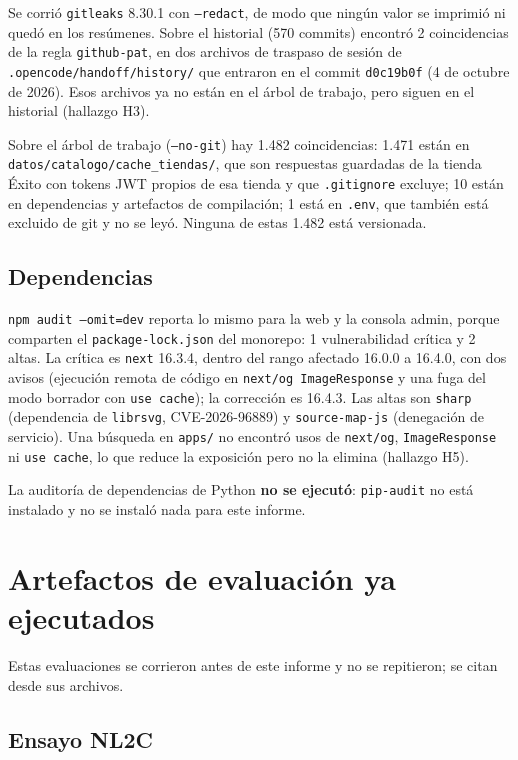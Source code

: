 \documentclass[11pt,letterpaper]{article}
\newcommand{\ruta}[1]{\texttt{\small #1}}
\begin{document}
Se corrió \ruta{gitleaks} 8.30.1 con \ruta{--redact}, de modo que ningún valor se imprimió ni quedó en los
resúmenes. Sobre el historial (570 commits) encontró 2 coincidencias de la regla \ruta{github-pat}, en dos
archivos de traspaso de sesión de \ruta{.opencode/\allowbreak{}handoff/\allowbreak{}history/} que entraron en el commit \ruta{d0c19b0f}
(4 de octubre de 2026). Esos archivos ya no están en el árbol de trabajo, pero siguen en el historial
(hallazgo H3).

Sobre el árbol de trabajo (\ruta{--no-git}) hay 1.482 coincidencias: 1.471 están en
\ruta{datos/\allowbreak{}catalogo/\allowbreak{}cache\_\allowbreak{}tiendas/}, que son respuestas guardadas de la tienda Éxito con tokens JWT
propios de esa tienda y que \ruta{.gitignore} excluye; 10 están en dependencias y artefactos de compilación; 1
está en \ruta{.env}, que también está excluido de git y no se leyó. Ninguna de estas 1.482 está versionada.

\subsection{Dependencias}

\ruta{npm audit --omit=dev} reporta lo mismo para la web y la consola admin, porque comparten el
\ruta{package-lock.json} del monorepo: 1 vulnerabilidad crítica y 2 altas. La crítica es \ruta{next} 16.3.4,
dentro del rango afectado 16.0.0 a 16.4.0, con dos avisos (ejecución remota de código en
\ruta{next/\allowbreak{}og ImageResponse} y una fuga del modo borrador con \ruta{use cache}); la corrección es 16.4.3. Las
altas son \ruta{sharp} (dependencia de \ruta{librsvg}, CVE-2026-96889) y \ruta{source-map-js} (denegación de
servicio). Una búsqueda en \ruta{apps/} no encontró usos de \ruta{next/\allowbreak{}og}, \ruta{ImageResponse} ni
\ruta{use cache}, lo que reduce la exposición pero no la elimina (hallazgo H5).

La auditoría de dependencias de Python \textbf{no se ejecutó}: \ruta{pip-audit} no está instalado y no se
instaló nada para este informe.

\section{Artefactos de evaluación ya ejecutados}\label{sec:artefactos}

Estas evaluaciones se corrieron antes de este informe y no se repitieron; se citan desde sus archivos.

\subsection{Ensayo NL2C}
\end{document}
